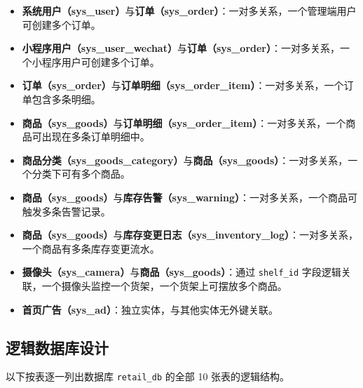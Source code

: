 \begin{itemize}[leftmargin=2em]
  \item \textbf{系统用户（sys\_user）}与\textbf{订单（sys\_order）}：一对多关系，一个管理端用户可创建多个订单。
  \item \textbf{小程序用户（sys\_user\_wechat）}与\textbf{订单（sys\_order）}：一对多关系，一个小程序用户可创建多个订单。
  \item \textbf{订单（sys\_order）}与\textbf{订单明细（sys\_order\_item）}：一对多关系，一个订单包含多条明细。
  \item \textbf{商品（sys\_goods）}与\textbf{订单明细（sys\_order\_item）}：一对多关系，一个商品可出现在多条订单明细中。
  \item \textbf{商品分类（sys\_goods\_category）}与\textbf{商品（sys\_goods）}：一对多关系，一个分类下可有多个商品。
  \item \textbf{商品（sys\_goods）}与\textbf{库存告警（sys\_warning）}：一对多关系，一个商品可触发多条告警记录。
  \item \textbf{商品（sys\_goods）}与\textbf{库存变更日志（sys\_inventory\_log）}：一对多关系，一个商品有多条库存变更流水。
  \item \textbf{摄像头（sys\_camera）}与\textbf{商品（sys\_goods）}：通过 \texttt{shelf\_id} 字段逻辑关联，一个摄像头监控一个货架，一个货架上可摆放多个商品。
  \item \textbf{首页广告（sys\_ad）}：独立实体，与其他实体无外键关联。
\end{itemize}

\subsection{逻辑数据库设计}

以下按表逐一列出数据库 \texttt{retail\_db} 的全部 10 张表的逻辑结构。


